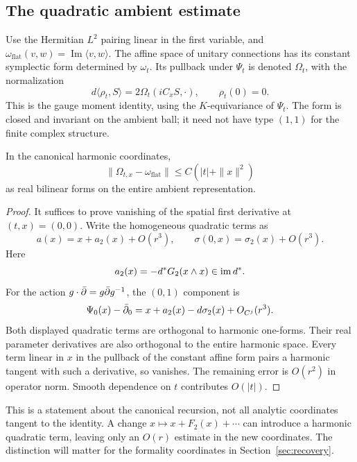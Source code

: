 \subsection{The quadratic ambient estimate}

Use the Hermitian $L^2$ pairing linear in the first variable, and
$\omega_{\mathrm{flat}}(v,w)=\operatorname{Im}\langle v,w\rangle$.
The affine space of unitary connections has its constant symplectic
form determined by $\omega_t$. Its pullback under $\Psi_t$ is denoted
$\Omega_t$, with the normalization
\begin{equation}\label{eq:moment-identity}
 d\langle\rho_t,S\rangle=2\Omega_t(iC_xS,\cdot),\qquad \rho_t(0)=0 .
\end{equation}
This is the gauge moment identity, using the $K$-equivariance of
$\Psi_t$. The form is closed and invariant on the ambient ball;
it need not have type $(1,1)$ for the finite complex structure.

\begin{proposition}\label{prop:quadratic-form}
In the canonical harmonic coordinates,
\begin{equation}\label{eq:quadratic-form}
 \|\Omega_{t,x}-\omega_{\mathrm{flat}}\|
                 \le C(|t|+\|x\|^2)
\end{equation}
as real bilinear forms on the entire ambient representation.
\end{proposition}

\begin{proof}
It suffices to prove vanishing of the spatial first derivative at
$(t,x)=(0,0)$. Write the homogeneous quadratic terms as
\[
 a(x)=x+a_2(x)+O(r^3),\qquad
 \sigma(0,x)=\sigma_2(x)+O(r^3).
\]
Here
\[
 a_2(x)=-d^*G_2(x\wedge x)\in\operatorname{im} d^* .
\]
For the action $g\cdot\bar\partial=g\bar\partial g^{-1}$, the $(0,1)$ component is
\begin{equation}\label{eq:two-jets}
 \Psi_0(x)-\bar\partial_0
        =x+a_2(x)-d\sigma_2(x)+O_{C^j}(r^3).
\end{equation}
Both displayed quadratic terms are orthogonal to harmonic one-forms.
Their real parameter derivatives are also orthogonal to the entire
harmonic space. Every term linear in $x$ in the pullback of the
constant affine form pairs a harmonic tangent with such a derivative,
so vanishes. The remaining error is $O(r^2)$ in operator norm.
Smooth dependence on $t$ contributes $O(|t|)$.
\end{proof}

This is a statement about the canonical recursion, not all analytic
coordinates tangent to the identity. A change $x\mapsto x+F_2(x)+\cdots$
can introduce a harmonic quadratic term, leaving only an $O(r)$
estimate in the new coordinates. The distinction will matter for the
formality coordinates in Section~\ref{sec:recovery}.

